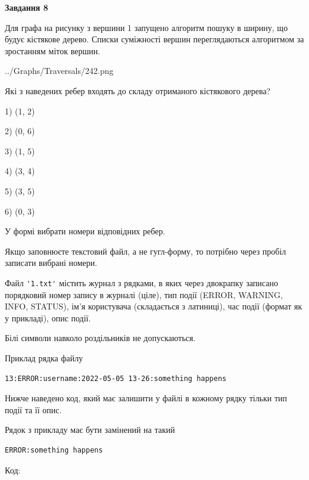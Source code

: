 \documentclass[12pt, ukrainian]{article}
\def\code#1{\Verb!#1!}
\begin{document}
{\begin {large}
{\begin {center}\textbf{Завдання 8}\end {center}}\par
Для графа на рисунку з вершини 1 запущено алгоритм пошуку в ширину, що будує кістякове дерево. Списки суміжності вершин переглядаються алгоритмом за зростанням міток вершин.\par
\begin{center}
	{../Graphs/Traversals/242.png}
\end{center}
\par Які з наведених ребер входять до складу отриманого кістякового дерева?\par
1) (1, 2)\par
2) (0, 6)\par
3) (1, 5)\par
4) (3, 4)\par
5) (3, 5)\par
6) (0, 3)\par
{\vskip 15pt} У формі вибрати номери відповідних ребер.


Якщо заповнюєте текстовий файл, а не гугл-форму, то потрібно через пробіл записа\-ти вибрані номери.\par
\newpage


Файл \code{'1.txt'} містить журнал з рядками, в яких через двокрапку записано поряд\-ко\-вий номер запису в журналі (ціле), тип події (ERROR, WARNING, INFO, STATUS), ім'я користувача (складається з латиниці), час події (фор\-мат як у прикладі), опис події.

Білі символи навколо роздільників не допускаються.

Приклад рядка файлу



\begin{verbatim}
13:ERROR:username:2022-05-05 13-26:something happens
\end{verbatim}


Нижче наведено код, який має залишити у файлі в кожному рядку тільки тип події та її опис.

Рядок з прикладу має бути замінений на такий



\begin{verbatim}
ERROR:something happens
\end{verbatim}




Код:




\end{large}}
\end{document}
